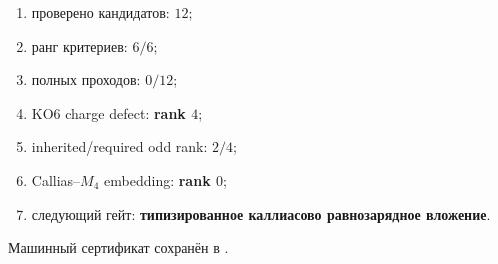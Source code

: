 \begin{protocol}\begin{enumerate}
\item проверено кандидатов: \textbf{$12$};
\item ранг критериев: \textbf{$6/6$};
\item полных проходов: \textbf{$0/12$};
\item KO6 charge defect: \textbf{rank $4$};
\item inherited/required odd rank: \textbf{$2/4$};
\item Callias--$M_4$ embedding: \textbf{rank $0$};
\item следующий гейт: \textbf{типизированное каллиасово равнозарядное вложение}.
\end{enumerate}\end{protocol}

Машинный сертификат сохранён в
.